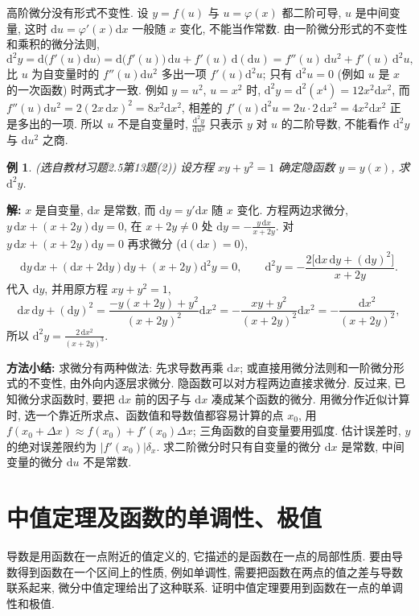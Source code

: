 \documentclass[UTF8,openany]{ctexbook}
\theoremstyle{chinesetextbook}
\newtheorem{example}{例}[section]
\newenvironment{cnsolution}{\par\indent\textbf{解:} \ignorespaces}{\par}
\newcommand{\dd}{\mathrm d}
\begin{document}
高阶微分没有形式不变性. 设 $y=f(u)$ 与 $u=\varphi(x)$ 都二阶可导, $u$ 是中间变量, 这时 $\dd u=\varphi'(x)\dd x$ 一般随 $x$ 变化, 不能当作常数. 由一阶微分形式的不变性和乘积的微分法则,
\[
\dd^2y=\dd\bigl(f'(u)\dd u\bigr)=\dd\bigl(f'(u)\bigr)\,\dd u+f'(u)\,\dd(\dd u)=f''(u)\,\dd u^2+f'(u)\,\dd^2u,
\]
比 $u$ 为自变量时的 $f''(u)\dd u^2$ 多出一项 $f'(u)\dd^2u$; 只有 $\dd^2u=0$ (例如 $u$ 是 $x$ 的一次函数) 时两式才一致. 例如 $y=u^2$, $u=x^2$ 时, $\dd^2y=\dd^2(x^4)=12x^2\dd x^2$, 而 $f''(u)\dd u^2=2(2x\,\dd x)^2=8x^2\dd x^2$, 相差的 $f'(u)\dd^2u=2u\cdot2\,\dd x^2=4x^2\dd x^2$ 正是多出的一项. 所以 $u$ 不是自变量时, $\displaystyle\frac{\dd^2y}{\dd u^2}$ 只表示 $y$ 对 $u$ 的二阶导数, 不能看作 $\dd^2y$ 与 $\dd u^2$ 之商.
\begin{example}\label{ex:c2-h5-13}
\textnormal{(选自教材习题2.5第13题(2))} 设方程 $xy+y^2=1$ 确定隐函数 $y=y(x)$, 求 $\dd^2y$.
\end{example}
\begin{cnsolution}
$x$ 是自变量, $\dd x$ 是常数, 而 $\dd y=y'\dd x$ 随 $x$ 变化. 方程两边求微分, $y\,\dd x+(x+2y)\dd y=0$, 在 $x+2y\ne0$ 处 $\displaystyle\dd y=-\frac{y\,\dd x}{x+2y}$. 对 $y\,\dd x+(x+2y)\dd y=0$ 再求微分 ($\dd(\dd x)=0$),
\[
\dd y\,\dd x+(\dd x+2\dd y)\dd y+(x+2y)\dd^2y=0,\qquad\dd^2y=-\frac{2\bigl[\dd x\,\dd y+(\dd y)^2\bigr]}{x+2y}.
\]
代入 $\dd y$, 并用原方程 $xy+y^2=1$,
\[
\dd x\,\dd y+(\dd y)^2=\frac{-y(x+2y)+y^2}{(x+2y)^2}\dd x^2=-\frac{xy+y^2}{(x+2y)^2}\dd x^2=-\frac{\dd x^2}{(x+2y)^2},
\]
所以 $\displaystyle\dd^2y=\frac{2\,\dd x^2}{(x+2y)^3}$.
\end{cnsolution}
\par\indent\textbf{方法小结:} 求微分有两种做法: 先求导数再乘 $\dd x$; 或直接用微分法则和一阶微分形式的不变性, 由外向内逐层求微分. 隐函数可以对方程两边直接求微分. 反过来, 已知微分求函数时, 要把 $\dd x$ 前的因子与 $\dd x$ 凑成某个函数的微分. 用微分作近似计算时, 选一个靠近所求点、函数值和导数值都容易计算的点 $x_0$, 用 $f(x_0+\Delta x)\approx f(x_0)+f'(x_0)\Delta x$; 三角函数的自变量要用弧度. 估计误差时, $y$ 的绝对误差限约为 $|f'(x_0)|\delta_x$. 求二阶微分时只有自变量的微分 $\dd x$ 是常数, 中间变量的微分 $\dd u$ 不是常数.
\section{中值定理及函数的单调性、极值}
导数是用函数在一点附近的值定义的, 它描述的是函数在一点的局部性质. 要由导数得到函数在一个区间上的性质, 例如单调性, 需要把函数在两点的值之差与导数联系起来, 微分中值定理给出了这种联系. 证明中值定理要用到函数在一点的单调性和极值.
\end{document}
